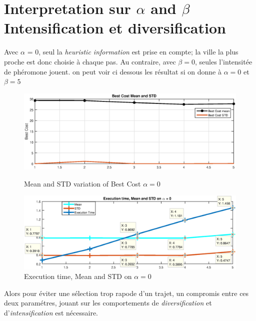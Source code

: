 \flushleft
\section{Interpretation sur $ \alpha $ and $ \beta $ Intensification et diversification}

Avec $ \alpha $ = 0, seul la \textit{heuristic information} est prise en compte; la ville la plus proche est donc choisie \`a chaque pas. Au contraire, avec $ \beta = 0 $, seules l'intensit\'ee de ph\'eromone jouent. on peut voir ci dessous les r\'esultat si on donne \`a $ \alpha = 0 $ et $ \beta = 5 $\\

\begin{figure}[H]
\begin{minipage}[t]{0.5\linewidth}
\centering
\includegraphics[width=\linewidth]{../figures/exp_alpha_0/BestCost_meanANDstd.eps}
\caption{Mean and STD variation of Best Cost $ \alpha=0 $}
\label{fig:exp_alpha_0_BestCost_meanANDstd}
\end{minipage}
\hspace{2mm}
\begin{minipage}[t]{0.5\linewidth}
\centering
\includegraphics[width=\textwidth]{../figures/exp_alpha_0/AS_ExecTimeMeanAndSTD.eps}
\caption{Execution time, Mean and STD on $ \alpha = 0 $}
\label{fig:exp_alpha_0_AS_ExecTimeMeanAndSTD}
\end{minipage}
\end{figure}
Alors pour \'eviter une s\'election trop rapode d'un trajet, un compromis entre ces deux param\'etres, jouant sur les comportements de \textit{diversification} et d'\textit{intensification} est n\'ecessaire.


